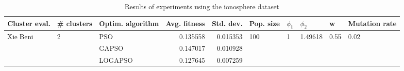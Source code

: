 \begin{table}
\centering
\caption{Results of experiments using the ionosphere dataset}
\begin{tabular}{lllrrlllll}
\toprule
            Cluster eval. &        \# clusters & Optim. algorithm &  Avg. fitness &  Std. dev. &            Pop. size &         $\phi_{1}$ &               $\phi_{2}$ &                     w &         Mutation rate \\
\midrule
\multirow{3}{*}{Xie Beni} & \multirow{3}{*}{2} &              PSO &      0.135558 &   0.015353 & \multirow{3}{*}{100} & \multirow{3}{*}{1} & \multirow{3}{*}{1.49618} & \multirow{3}{*}{0.55} & \multirow{3}{*}{0.02} \\
                          &                    &            GAPSO &      0.147017 &   0.010928 &                      &                    &                          &                       &                       \\
                          &                    &          LOGAPSO &      0.127645 &   0.007259 &                      &                    &                          &                       &                       \\
\bottomrule
\end{tabular}
\end{table}
